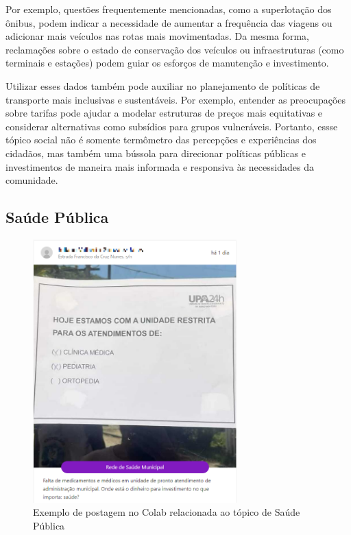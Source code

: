 Por exemplo, questões frequentemente mencionadas, como a superlotação dos ônibus, podem indicar a necessidade de aumentar a frequência das viagens ou adicionar mais veículos nas rotas mais movimentadas. Da mesma forma, reclamações sobre o estado de conservação dos veículos ou infraestruturas (como terminais e estações) podem guiar os esforços de manutenção e investimento.

Utilizar esses dados também pode auxiliar no planejamento de políticas de transporte mais inclusivas e sustentáveis. Por exemplo, entender as preocupações sobre tarifas pode ajudar a modelar estruturas de preços mais equitativas e considerar alternativas como subsídios para grupos vulneráveis. Portanto, essse tópico social não é somente termômetro das percepções e experiências dos cidadãos, mas também uma bússola para direcionar políticas públicas e investimentos de maneira mais informada e responsiva às necessidades da comunidade.

\subsection{Saúde Pública}

\begin{figure}[htb]
	\centering
	\includegraphics[width=0.7\textwidth]{images/colab_posts_health.png}
	\caption{Exemplo de postagem no Colab relacionada ao tópico de Saúde Pública}
	\label{fig:colab_posts_health}
\end{figure}

